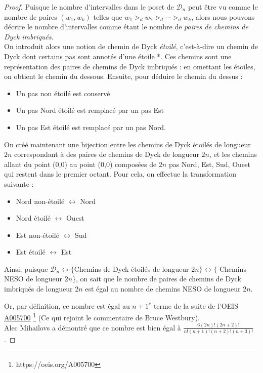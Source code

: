 \begin{proof}
    Puisque le nombre d'intervalles dans le poset de $\mathcal{D}_n$
    peut être vu comme le nombre de paires $(w_1, w_k)$ telles que
    $w_1 \gtrdot_d w_2 \gtrdot_d \cdots \gtrdot_d w_k$, alors nous pouvons
    décrire le nombre d'intervalles comme étant le nombre de 
    \emph{paires de chemins de Dyck imbriqués}.\\
    On introduit alors une notion de chemin de Dyck \emph{étoilé},
    c'est-à-dire un chemin de Dyck dont certains pas sont annotés d'une
    étoile *. Ces chemins sont une représentation des paires de chemins de
    Dyck imbriqués : en omettant les étoiles, on obtient le chemin du dessous.
    Ensuite, pour déduire le chemin du dessus :
    \begin{itemize}
        \item Un pas non étoilé est conservé
        \item Un pas Nord étoilé est remplacé par un pas Est
        \item Un pas Est étoilé est remplacé par un pas Nord.
    \end{itemize}
    On créé maintenant une bijection entre les chemins de Dyck étoilés
    de longueur $2n$ correspondant à des paires de chemins de Dyck de
    longueur $2n$, et les chemins allant du point (0,0) au point (0,0)
    composées de $2n$ pas Nord, Est, Sud, Ouest qui restent dans le
    premier octant.
    Pour cela, on effectue la transformation suivante :
    \begin{itemize}
        \item Nord non-étoilé $\longleftrightarrow$ Nord
        \item Nord étoilé $\longleftrightarrow$ Ouest
        \item Est non-étoilé $\longleftrightarrow$ Sud
        \item Est étoilé $\longleftrightarrow$ Est
    \end{itemize}
    Ainsi, puisque $\mathcal{D}_n \longleftrightarrow \{$Chemins de Dyck
    étoilés de longueur $2n\} \longleftrightarrow \{$ Chemins NESO de
    longueur $2n\}$, on sait que le nombre de paires de chemins de Dyck
    imbriqués de longueur $2n$ est égal au nombre de chemins NESO de
    longueur $2n$.

    Or, par définition, ce nombre est égal au $n+1^{e}$ terme de la suite
    de l'OEIS \href{https://oeis.org/A005700}{A005700}
    \footnote{https://oeis.org/A005700} (Ce qui rejoint le commentaire de 
    Bruce Westbury).\\
    Alec Mihailovs a démontré que ce nombre est bien égal à 
    $\displaystyle\frac {6 (2n)! (2n+2)!}{n!(n+1)!(n+2)!(n+3)!}$.
\end{proof}

